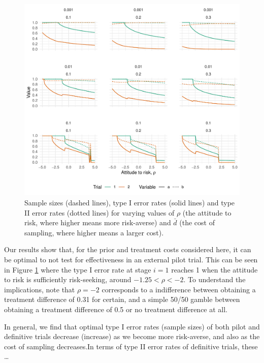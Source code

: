 \documentclass[sagev, Crown]{sagej}
\begin{document}
\begin{figure}
\centering
\includegraphics[scale=0.8]{./Figures/eval.pdf}
\caption{Sample sizes (dashed lines), type I error rates (solid lines) and type II error rates (dotted lines) for varying values of $\rho$ (the attitude to risk, where higher means more risk-averse) and $\bar{d}$ (the cost of sampling, where higher means a larger cost).}
\label{fig:eval}
\end{figure}

Our results show that, for the prior and treatment costs considered here, it can be optimal to not test for effectiveness in an external pilot trial. This can be seen in Figure \ref{fig:eval} where the type I error rate at stage $i=1$ reaches 1 when the attitude to risk is sufficiently risk-seeking, around $-1.25 < \rho < -2$. To understand the implications, note that $\rho = -2$ corresponds to a indifference between obtaining a treatment difference of 0.31 for certain, and a simple 50/50 gamble between obtaining a treatment difference of 0.5 or no treatment difference at all. 

In general, we find that optimal type I error rates (sample sizes) of both pilot and definitive trials decrease (increase) as we become more risk-averse, and also as the cost of sampling decreases.In terms of type II error rates of definitive trials, these \ldots
\end{document}
